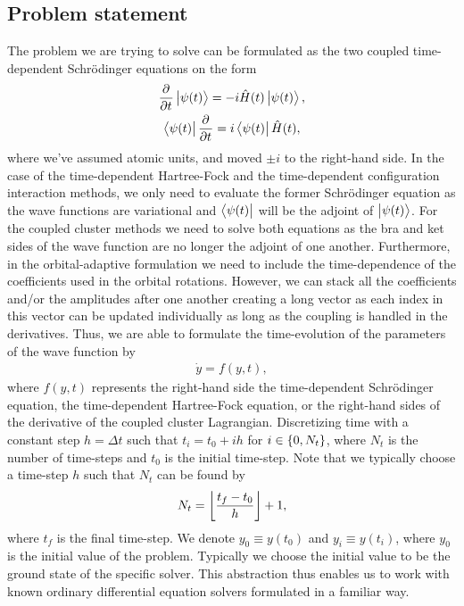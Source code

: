         \subsection{Problem statement}
            The problem we are trying to solve can be formulated as the
            two coupled time-dependent Schrödinger equations on the form
            \begin{gather}
                \dpd{}{t}\ket{\psi(t)}
                = -i\hamil(t)\ket{\psi(t)},
                \\
                \bra{\psi(t)}\dpd{}{t}
                = i\bra{\psi(t)}\hamil(t),
            \end{gather}
            where we've assumed atomic units, and moved $\pm i$ to the right-hand
            side.
            In the case of the time-dependent Hartree-Fock and the
            time-dependent configuration interaction methods, we only need to
            evaluate the former Schrödinger equation as the wave functions are
            variational and $\bra{\psi(t)}$ will be the adjoint of
            $\ket{\psi(t)}$.
            For the coupled cluster methods we need to solve both equations as
            the bra and ket sides of the wave function are no longer the adjoint
            of one another.
            Furthermore, in the orbital-adaptive formulation we need to include
            the time-dependence of the coefficients used in the orbital
            rotations.
            However, we can stack all the coefficients and/or the amplitudes
            after one another creating a long vector as each index in this
            vector can be updated individually as long as the coupling is
            handled in the derivatives.
            Thus, we are able to formulate the time-evolution of the
            parameters of the wave function by
            \begin{align}
                \dot{y} = f(y, t),
            \end{align}
            where $f(y, t)$ represents the right-hand side the time-dependent
            Schrödinger equation, the time-dependent Hartree-Fock equation, or
            the right-hand sides of the derivative of the coupled cluster
            Lagrangian.
            Discretizing time with a constant step $h = \Delta t$ such that $t_i
            = t_0 + i h$ for $i \in \left\{ 0, N_t \right\}$, where $N_t$ is the number of
            time-steps and $t_0$ is the initial time-step.
            Note that we typically choose a time-step $h$ such that $N_t$ can be
            found by
            \begin{align}
                N_t = \left\lfloor \frac{t_f - t_0}{h} \right\rfloor + 1,
            \end{align}
            where $t_f$ is the final time-step.
            We denote $y_0 \equiv y(t_0)$ and $y_i \equiv y(t_i)$, where $y_0$
            is the initial value of the problem.
            Typically we choose the initial value to be the ground state of the
            specific solver.
            This abstraction thus enables us to work with known ordinary
            differential equation solvers formulated in a familiar way.

